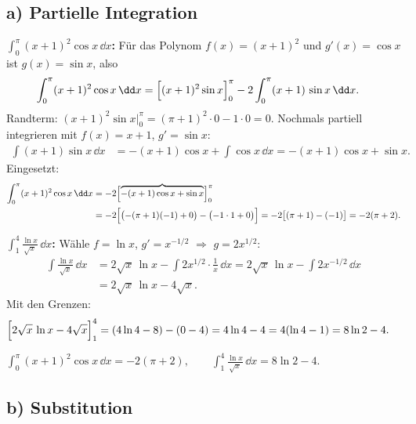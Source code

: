 
\subsection*{a) Partielle Integration}

\textbf{$\int_0^\pi (x+1)^2\cos x\,\dd x$:} Für das Polynom $f(x)=(x+1)^2$
und $g'(x)=\cos x$ ist $g(x)=\sin x$, also
\begin{align}
  \int_0^\pi (x+1)^2\cos x\,\dd x
  &= \Bigl[(x+1)^2\sin x\Bigr]_0^\pi
     - 2\int_0^\pi (x+1)\,\sin x\,\dd x .
\end{align}
Randterm: $(x+1)^2\sin x\big|_0^\pi = (\pi+1)^2\cdot0-1\cdot0=0$. Nochmals
partiell integrieren mit $f(x)=x+1$, $g'=\sin x$:
\begin{align}
  \int (x+1)\sin x\,\dd x
  &= -(x+1)\cos x + \int \cos x\,\dd x
   = -(x+1)\cos x + \sin x .
\end{align}
Eingesetzt:
\begin{align}
  \int_0^\pi (x+1)^2\cos x\,\dd x
  &= -2\Bigl[\overbrace{-(x+1)\cos x+\sin x}\Bigr]_0^\pi \\
  &= -2\Bigl[\bigl(-(\pi+1)(-1)+0\bigr)-\bigl(-1\cdot1+0\bigr)\Bigr]
   = -2\bigl[(\pi+1)-(-1)\bigr]
   = -2(\pi+2).
\end{align}

\textbf{$\int_1^4 \frac{\ln x}{\sqrt x}\,\dd x$:} Wähle $f=\ln x$, $g'=x^{-1/2}$
$\Rightarrow$ $g=2x^{1/2}$:
\begin{align}
  \int \frac{\ln x}{\sqrt x}\,\dd x
  &= 2\sqrt x\,\ln x - \int 2x^{1/2}\cdot\frac1x\,\dd x
   = 2\sqrt x\,\ln x - \int 2x^{-1/2}\,\dd x \\
  &= 2\sqrt x\,\ln x - 4\sqrt x .
\end{align}
Mit den Grenzen:
\begin{align}
  \Bigl[2\sqrt x\,\ln x - 4\sqrt x\Bigr]_1^4
  &= (4\ln4 - 8) - (0-4) = 4\ln4 - 4 = 4(\ln4-1) = 8\ln2 - 4 .
\end{align}

\begin{ergebnis}
$\displaystyle\int_0^\pi (x+1)^2\cos x\,\dd x = -2(\pi+2),\qquad
\int_1^4\frac{\ln x}{\sqrt x}\,\dd x = 8\ln2-4.$
\end{ergebnis}

\subsection*{b) Substitution}

